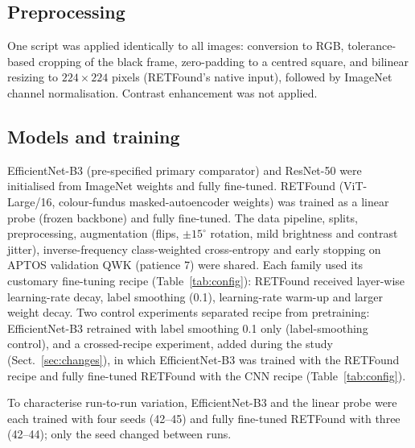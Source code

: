 \documentclass[pdflatex,sn-basic,Numbered]{sn-jnl}
\begin{document}
\subsection{Preprocessing}

One script was applied identically to all images: conversion to RGB, tolerance-based cropping of the black frame, zero-padding to a centred square, and bilinear resizing to $224\times224$ pixels (RETFound's native input), followed by ImageNet channel normalisation. Contrast enhancement was not applied.

\subsection{Models and training}\label{sec:models}

EfficientNet-B3 \cite{tan2019efficientnet} (pre-specified primary comparator) and ResNet-50 \cite{he2016resnet} were initialised from ImageNet weights and fully fine-tuned. RETFound \cite{zhou2023retfound} (ViT-Large/16, colour-fundus masked-autoencoder weights) was trained as a linear probe (frozen backbone) and fully fine-tuned. The data pipeline, splits, preprocessing, augmentation (flips, $\pm15^\circ$ rotation, mild brightness and contrast jitter), inverse-frequency class-weighted cross-entropy and early stopping on APTOS validation QWK (patience 7) were shared. Each family used its customary fine-tuning recipe (Table~\ref{tab:config}): RETFound received layer-wise learning-rate decay, label smoothing (0.1), learning-rate warm-up and larger weight decay. Two control experiments separated recipe from pretraining: EfficientNet-B3 retrained with label smoothing 0.1 only (label-smoothing control), and a crossed-recipe experiment, added during the study (Sect.~\ref{sec:changes}), in which EfficientNet-B3 was trained with the RETFound recipe and fully fine-tuned RETFound with the CNN recipe (Table~\ref{tab:config}).

To characterise run-to-run variation, EfficientNet-B3 and the linear probe were each trained with four seeds (42--45) and fully fine-tuned RETFound with three (42--44); only the seed changed between runs.
\end{document}
